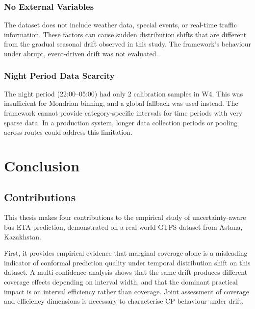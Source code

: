 \documentclass[12pt, a4paper, oneside]{report}
\begin{document}
\subsection{No External Variables}

The dataset does not include weather data, special events, or real-time traffic information. These factors can cause sudden distribution shifts that are different from the gradual seasonal drift observed in this study. The framework's behaviour under abrupt, event-driven drift was not evaluated.

\subsection{Night Period Data Scarcity}

The night period (22:00--05:00) had only 2 calibration samples in W4. This was insufficient for Mondrian binning, and a global fallback was used instead. The framework cannot provide category-specific intervals for time periods with very sparse data. In a production system, longer data collection periods or pooling across routes could address this limitation.


\chapter{Conclusion}
\label{ch:conclusion}


\section{Contributions}
\label{sec:contributions}

This thesis makes four contributions to the empirical study of uncertainty-aware bus ETA prediction, demonstrated on a real-world GTFS dataset from Astana, Kazakhstan.

First, it provides empirical evidence that marginal coverage alone is a misleading indicator of conformal prediction quality under temporal distribution shift on this dataset. A multi-confidence analysis shows that the same drift produces different coverage effects depending on interval width, and that the dominant practical impact is on interval efficiency rather than coverage. Joint assessment of coverage and efficiency dimensions is necessary to characterise CP behaviour under drift.
\end{document}
